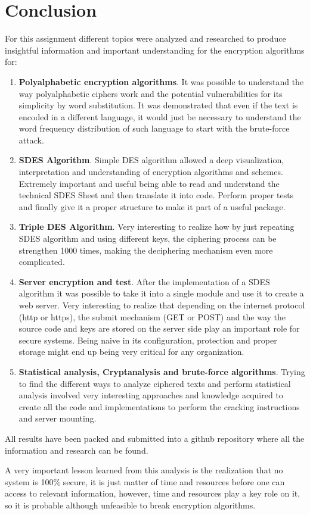 \documentclass[letterpaper,12pt]{article}
\begin{document}
\section{Conclusion}
For this assignment different topics were analyzed and researched to produce insightful information and important understanding for the encryption algorithms for:
\begin{enumerate}
    \item \textbf{Polyalphabetic encryption algorithms}. It was possible to understand the way polyalphabetic ciphers work and the potential vulnerabilities for its simplicity by word substitution. It was demonstrated that even if the text is encoded in a different language, it would just be necessary to understand the word frequency distribution of such language to start with the brute-force attack.
    \item \textbf{SDES Algorithm}. Simple DES algorithm allowed a deep visualization, interpretation and understanding of encryption algorithms and schemes. Extremely important and useful being able to read and understand the technical SDES Sheet\cite{WS2017-SDES} and then translate it into code. Perform proper tests and finally give it a proper structure to make it part of a useful package. 
    \item \textbf{Triple DES Algorithm}. Very interesting to realize how by just repeating SDES algorithm and using different keys, the ciphering process can be strengthen 1000 times, making the deciphering mechanism even more complicated.
    \item \textbf{Server encryption and test}. After the implementation of a SDES algorithm it was possible to take it into a single module and use it to create a web server. Very interesting to realize that depending on the internet protocol (http or https), the submit mechanism (GET or POST) and the way the source code and keys are stored on the server side play an important role for secure systems. Being naive in its configuration, protection and proper storage might end up being very critical for any organization.
    \item \textbf{Statistical analysis, Cryptanalysis and brute-force algorithms}. Trying to find the different ways to analyze ciphered texts and perform statistical analysis involved very interesting approaches and knowledge acquired to create all the code and implementations to perform the cracking instructions and server mounting.
\end{enumerate}
All results have been packed and submitted into a github repository where all the information and research can be found.

A very important lesson learned from this analysis is the realization that no system is 100\% secure, it is just matter of time and resources before one can access to relevant information, however, time and resources play a key role on it, so it is probable although unfeasible to break encryption algorithms.




\end{document}
